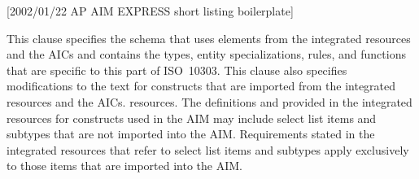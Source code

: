 [2002/01/22 AP AIM EXPRESS short listing boilerplate]

  This clause specifies the \Express{} schema that uses
elements from the integrated resources
\ifaicinap and the AICs \fi
and contains the types, entity specializations, rules,
and functions that are specific to this part of ISO~10303.
This clause also specifies modifications to the text
for constructs that are imported from the
integrated
\ifaicinap resources and the AICs. \else resources. \fi
The definitions and
\Express{} provided in the integrated resources for constructs
used in the AIM may include select list items and subtypes
that are not imported into the AIM. Requirements stated
in the integrated resources that refer to select list items and
subtypes apply exclusively to those items that are imported
into the AIM.

\endinput
